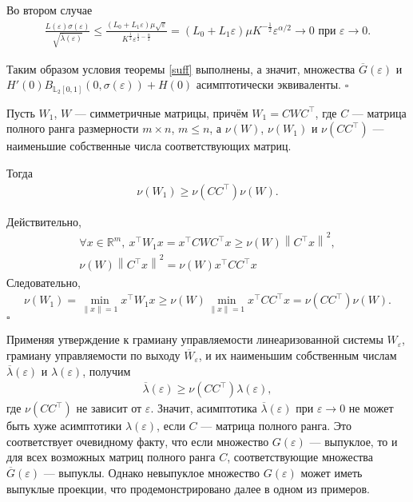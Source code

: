 \documentclass[../main.tex]{subfiles}
\begin{document}
 Во втором случае
 \begin{gather*}
 \frac{L(\varepsilon) \sigma(\varepsilon)}{\sqrt{\overline{\lambda}(\varepsilon)}} 
 \leqslant
 \frac{(L_0+L_1\varepsilon)\mu\sqrt{\varepsilon}}{{K^{\frac{1}{2}}}\varepsilon^{\frac{1}{2}-\frac{\alpha}{2}}}
 =
 (L_0+L_1\varepsilon)\mu K^{-\frac{1}{2}}\varepsilon^{\alpha/2} \rightarrow 0 \mbox{\ при\ } \varepsilon \rightarrow 0.
 \end{gather*}
 
 Таким образом условия теоремы \ref{suff} выполнены, а значит, множества $ \overline{G}(\varepsilon) $ и \\$ H'(0)B_{\mathbb{L}_2[0,1]}(0,\sigma(\varepsilon))+ H(0) $ асимптотически эквиваленты.
 \hfill $\square$
 \begin{utv}
 Пусть $ W_1 $, $ W $ --- симметричные матрицы, причём $ W_1 = C W C^{\top} $, где $ C $ --- матрица полного ранга размерности $ m \times n $, $ m \leqslant n $, а $ \nu(W) $, $ \nu(W_1) $ и $ \nu(CC^{\top}) $ --- наименьшие собственные числа соответствующих матриц.
 
 Тогда
 \begin{gather*}
 \nu(W_1) \geqslant \nu(CC^{\top}) \nu(W).
 \end{gather*}
 \end{utv}
 \doc 
 Действительно,
 \begin{gather*}
 \forall x \in \mathbb{R}^m, \: x^{\top} W_1 x = x^{\top} C W C^{\top} x \geqslant \nu(W)\left\| C^{\top}x \right\| ^2,\\
 \nu(W)\left\| C^{\top}x \right\| ^2 = \nu(W) x^{\top} C C^{\top} x
 \end{gather*}
 Следовательно,
 \begin{gather*}
 \nu(W_1) = \min \limits_{\left\| x\right\| =1}x^{\top}W_1x \geqslant \nu(W)\min \limits_{\left\| x\right\| =1}x^{\top}CC^{\top}x = \nu(CC^{\top}) \nu(W). 
 \end{gather*}  \hfill $ \square $
 
 Применяя утверждение к грамиану управляемости линеаризованной системы $ W_{\varepsilon} $, грамиану управляемости по выходу $ \overline{W}_{\varepsilon}$, и их наименьшим собственным числам $ \overline{\lambda}(\varepsilon) $ и $ \lambda(\varepsilon) $, получим
 \begin{gather*}
 \overline{\lambda}(\varepsilon) \geqslant \nu(CC^{\top}) \lambda(\varepsilon),
 \end{gather*}
 где $ \nu(CC^{\top}) $ не зависит от $ \varepsilon $. 
 Значит, асимптотика $ \overline{\lambda}(\varepsilon) $ при $\varepsilon \rightarrow 0$ не может быть хуже асимптотики $ \lambda(\varepsilon) $, если $ C $ --- матрица полного ранга. 
 Это соответствует очевидному факту, что если множество $ G(\varepsilon) $ --- выпуклое, то и для всех возможных матриц полного ранга $ C $, соответствующие множества $ \overline{G}(\varepsilon) $ --- выпуклы. 
 Однако невыпуклое множество $ G(\varepsilon) $ может иметь выпуклые проекции, что продемонстрировано далее в одном из примеров.
 
\end{document}
